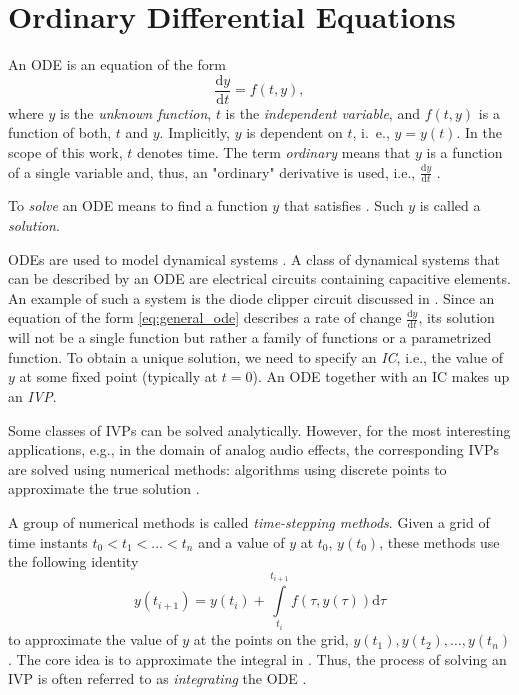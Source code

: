 \section{Ordinary Differential Equations}
\label{section:ode}

An \acf{ODE} is an equation of the form
\begin{equation}
  \frac{\mathrm{d} y}{\mathrm{d} t} = f(t, y),
  \label{eq:general_ode}
\end{equation}
where $y$ is the \emph{unknown function}, $t$ is the \emph{independent variable}, and $f(t, y)$ is a function of both, $t$ and $y$. Implicitly, $y$ is dependent on $t$, i.\ e., $y = y(t)$. In the scope of this work, $t$ denotes time. The term \emph{ordinary} means that $y$ is a function of a single variable and, thus, an "ordinary" derivative is used, i.e., $\frac{\mathrm{d} y}{\mathrm{d} t}$ \cite{Gockenbach2011}.

To \emph{solve} an \ac{ODE} means to find a function $y$ that satisfies . Such $y$ is called a \emph{solution}.

\acp{ODE} are used to model dynamical systems \cite{Scheinerman1996,Karlsson2019}. A class of dynamical systems that can be described by an \ac{ODE} are electrical circuits containing capacitive elements. An example of such a system is the diode clipper circuit \cite{Yeh2007} discussed in .
Since an equation of the form \eqref{eq:general_ode} describes a rate of change $\frac{\mathrm{d} y}{\mathrm{d} t}$, its solution will not be a single function but rather a family of functions or a parametrized function. To obtain a unique solution, we need to specify an \emph{\ac{IC}}, i.e., the value of $y$ at some fixed point (typically at $t=0$). An \ac{ODE} together with an \acl{IC} makes up an \emph{\ac{IVP}}.

Some classes of \acp{IVP} can be solved analytically. However, for the most interesting applications, e.g., in the domain of analog audio effects, the corresponding \acp{IVP} are solved using numerical methods: algorithms using discrete points to approximate the true solution \cite{Gockenbach2011}. 

A group of numerical methods is called \emph{time-stepping methods}. Given a grid of time instants $t_0 < t_1 < \dots < t_n$ and a value of $y$ at $t_0$, $y(t_0)$, these methods use the following identity
\begin{equation}
  y(t_{i+1}) = y(t_{i}) + \int \limits_{t_i}^{t_{i+1}} f(\tau, y(\tau)) \mathrm{d} \tau
  \label{eq:time_stepping_identity}
\end{equation}
to approximate the value of $y$ at the points on the grid, $y(t_1), y(t_2), \dots, y(t_n)$. The core idea is to approximate the integral in . Thus, the process of solving an \ac{IVP} is often referred to as \emph{integrating} the \ac{ODE} \cite{Gockenbach2011}.

